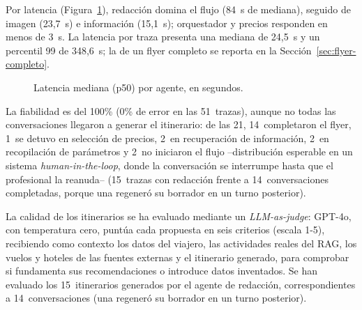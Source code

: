 Por latencia (Figura~\ref{fig:latency-by-agent}), redacción domina el flujo (84~s de mediana), seguido de imagen (23{,}7~s) e información (15{,}1~s); orquestador y precios responden en menos de 3~s. La latencia por traza presenta una mediana de 24{,}5~s y un percentil 99 de 348{,}6~s; la de un flyer completo se reporta en la Sección~\ref{sec:flyer-completo}.

\begin{figure}[htbp]
\centering
{}
\caption{Latencia mediana (p50) por agente, en segundos.}
\label{fig:latency-by-agent}
\end{figure}

La fiabilidad es del 100\% (0\% de error en las 51~trazas), aunque no todas las conversaciones llegaron a generar el itinerario: de las 21, 14~completaron el flyer, 1~se detuvo en selección de precios, 2~en recuperación de información, 2~en recopilación de parámetros y 2~no iniciaron el flujo --distribución esperable en un sistema \textit{human-in-the-loop}, donde la conversación se interrumpe hasta que el profesional la reanuda-- (15~trazas con redacción frente a 14~conversaciones completadas, porque una regeneró su borrador en un turno posterior).

La calidad de los itinerarios se ha evaluado mediante un \textit{LLM-as-judge}: GPT-4o, con temperatura cero, puntúa cada propuesta en seis criterios (escala 1-5), recibiendo como contexto los datos del viajero, las actividades reales del RAG, los vuelos y hoteles de las fuentes externas y el itinerario generado, para comprobar si fundamenta sus recomendaciones o introduce datos inventados. Se han evaluado los 15~itinerarios generados por el agente de redacción, correspondientes a 14~conversaciones (una regeneró su borrador en un turno posterior).

